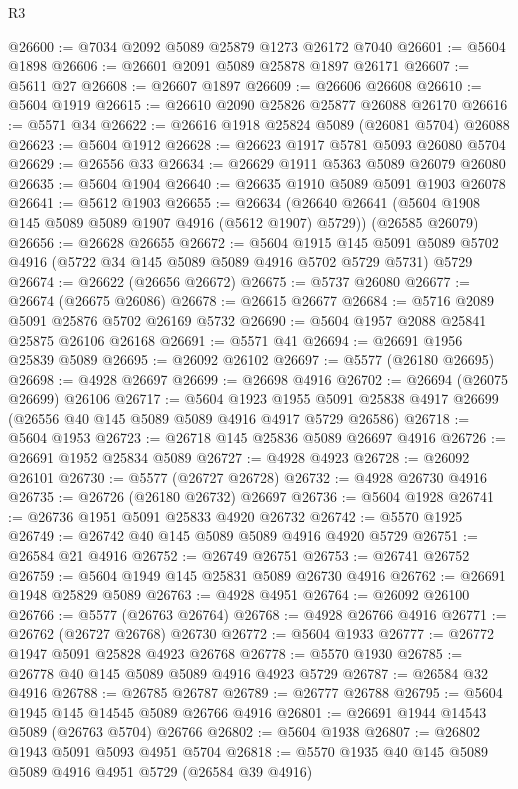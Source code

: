 \begin{lexlean}{R3}
\begin{coremodule}
@26600 := @7034 @2092 @5089 @25879 @1273 @26172 @7040
@26601 := @5604 @1898
@26606 := @26601 @2091 @5089 @25878 @1897 @26171
@26607 := @5611 @27
@26608 := @26607 @1897
@26609 := @26606 @26608
@26610 := @5604 @1919
@26615 := @26610 @2090 @25826 @25877 @26088 @26170
@26616 := @5571 @34
@26622 := @26616 @1918 @25824 @5089 (@26081 @5704) @26088
@26623 := @5604 @1912
@26628 := @26623 @1917 @5781 @5093 @26080 @5704
@26629 := @26556 @33
@26634 := @26629 @1911 @5363 @5089 @26079 @26080
@26635 := @5604 @1904
@26640 := @26635 @1910 @5089 @5091 @1903 @26078
@26641 := @5612 @1903
@26655 := @26634
    (@26640 @26641 (@5604 @1908 @145 @5089 @5089 @1907 @4916 (@5612 @1907) @5729))
    (@26585 @26079)
@26656 := @26628 @26655
@26672 := @5604
    @1915
    @145
    @5091
    @5089
    @5702
    @4916
    (@5722 @34 @145 @5089 @5089 @4916 @5702 @5729 @5731)
    @5729
@26674 := @26622 (@26656 @26672)
@26675 := @5737 @26080
@26677 := @26674 (@26675 @26086)
@26678 := @26615 @26677
@26684 := @5716 @2089 @5091 @25876 @5702 @26169 @5732
@26690 := @5604 @1957 @2088 @25841 @25875 @26106 @26168
@26691 := @5571 @41
@26694 := @26691 @1956 @25839 @5089
@26695 := @26092 @26102
@26697 := @5577 (@26180 @26695)
@26698 := @4928 @26697
@26699 := @26698 @4916
@26702 := @26694 (@26075 @26699) @26106
@26717 := @5604
    @1923
    @1955
    @5091
    @25838
    @4917
    @26699
    (@26556 @40 @145 @5089 @5089 @4916 @4917 @5729 @26586)
@26718 := @5604 @1953
@26723 := @26718 @145 @25836 @5089 @26697 @4916
@26726 := @26691 @1952 @25834 @5089
@26727 := @4928 @4923
@26728 := @26092 @26101
@26730 := @5577 (@26727 @26728)
@26732 := @4928 @26730 @4916
@26735 := @26726 (@26180 @26732) @26697
@26736 := @5604 @1928
@26741 := @26736 @1951 @5091 @25833 @4920 @26732
@26742 := @5570 @1925
@26749 := @26742 @40 @145 @5089 @5089 @4916 @4920 @5729
@26751 := @26584 @21 @4916
@26752 := @26749 @26751
@26753 := @26741 @26752
@26759 := @5604 @1949 @145 @25831 @5089 @26730 @4916
@26762 := @26691 @1948 @25829 @5089
@26763 := @4928 @4951
@26764 := @26092 @26100
@26766 := @5577 (@26763 @26764)
@26768 := @4928 @26766 @4916
@26771 := @26762 (@26727 @26768) @26730
@26772 := @5604 @1933
@26777 := @26772 @1947 @5091 @25828 @4923 @26768
@26778 := @5570 @1930
@26785 := @26778 @40 @145 @5089 @5089 @4916 @4923 @5729
@26787 := @26584 @32 @4916
@26788 := @26785 @26787
@26789 := @26777 @26788
@26795 := @5604 @1945 @145 @14545 @5089 @26766 @4916
@26801 := @26691 @1944 @14543 @5089 (@26763 @5704) @26766
@26802 := @5604 @1938
@26807 := @26802 @1943 @5091 @5093 @4951 @5704
@26818 := @5570 @1935 @40 @145 @5089 @5089 @4916 @4951 @5729 (@26584 @39 @4916)

\end{coremodule}
\end{lexlean}
